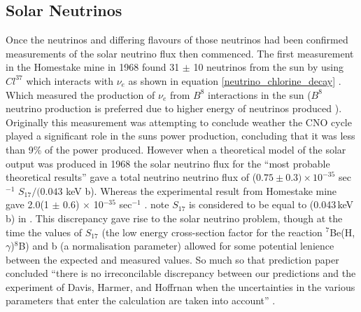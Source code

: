 \subsection{Solar Neutrinos}
Once the neutrinos and differing flavours of those neutrinos had been confirmed \cite{DanbyG1962PhysRevLett.9.36} measurements of the solar neutrino flux then commenced. The first measurement in the Homestake mine in 1968 found 31 $\pm$ 10 neutrinos from the sun \cite{davis1968homestake} by using $Cl^{37}$ which interacts with $\nu_e$ as shown in equation \ref{neutrino_chlorine_decay} \cite{Bellerive:2003rj}. Which measured the production of $\nu_e$ from $B^8$ interactions in the sun ($B^8$ neutrino production is preferred due to higher energy of neutrinos produced \cite{griffiths2008neutrinoOscillations}). Originally this measurement was attempting to conclude weather the CNO cycle played a significant role in the suns power production, concluding that it was less than 9\% of the power produced. However when a theoretical model of the solar output was produced in 1968 \cite{bahcall1968present} the solar neutrino flux for the ``most probable theoretical results'' gave a total neutrino neutrino flux of ($0.75 \pm 0.3) \times 10^{-35}$ sec$^{-1}$ $S_{17}/(0.043$ keV b). Whereas the experimental result from Homestake mine gave 2.0(1 $\pm$ 0.6) $\times$ 10$^{-35}$ sec$^{-1}$ \cite{davis1968homestake}. note $S_{17}$ is considered to be equal to (0.043\,keV b) in \cite{bahcall1968present}. This discrepancy gave rise to the solar neutrino problem, though at the time the values of $S_{17}$ (the low energy cross-section factor for the reaction $^7$Be(H,$\gamma$)$^8$B) and b (a normalisation parameter) allowed for some potential lenience between the expected and measured values. So much so that prediction paper concluded ``there is no irreconcilable discrepancy between our predictions and the experiment of Davis, Harmer, and Hoffrnan when the uncertainties in the various parameters that enter the calculation are taken into account'' \cite{bahcall1968present}.
